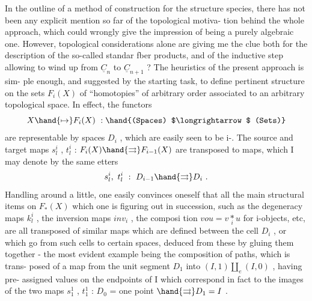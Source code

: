   In the outline of a method of construction for the structure species,
there has not been any explicit mention so far of the topological motiva-%
tion behind the whole approach,  which could wrongly give the impression
of being a purely algebraic one.  However,  topological considerations
alone are giving me the clue both for the description of the so-called
standar fber products,  and of the inductive step allowing to wind up
from $\underline{C}_{n}$ to $\underline{C}_{n+1}$ ?  The heuristics  of the present approach is sim-%
ple enough,  and suggested by the starting task,  to define pertinent
structure on the  sets $F_{i}(X)$ of ``homotopies'' of arbitrary order\hand{,} associated
to an arbitrary topological space.  In effect,  the  functors  
\[ X \hand{\mapsto} F_{i}(X) \ : \hand{(Spaces) $\longrightarrow$ (Sets)} \]
are representable by spaces $D_{i}$ ,  which are easily seen to be i-.
The source and  target maps  $s^{i}_{l}$ , $t^{i}_{l}$ : $F_{i}(X) \hand{\rightrightarrows} F_{i-1}(X)$  are transposed
to maps, which I may denote by the same etters
\[ s^{i}_{l},\ t^{i}_{l} \ : \ D_{i-1} \hand{\rightrightarrows} D_{i} \ . \]
Handling around a little,  one easily convinces oneself that all the
main structural items on $F_{*}(X)$ which one is figuring out in succession,
such as the degeneracy maps  $k^{i}_{l}$ ,  the inversion maps $inv_{i}$ ,  the composi
tion  $vou = v \underset{i}{*} u$  for  i-objects,  etc,  are all transposed of similar
maps which are defined between the cell $D_{i}$ ,  or which go from such
cells to certain spaces,  deduced from these by gluing them together -
the most evident example  being the composition of paths,  which is trans-%
posed of a map from the unit segment $D_{1}$ into $(I,1) \amalg_{e} (I,0)$ ,  having pre-%
assigned values on the endpoints of I \hand{(} which correspond in fact to the
images of the two maps  $s^{1}_{1}$ , $t_{1}^{1}$ :  $D_{0}$ = one point $\hand{\rightrightarrows} D_{1} = I$ \hand{)}.

